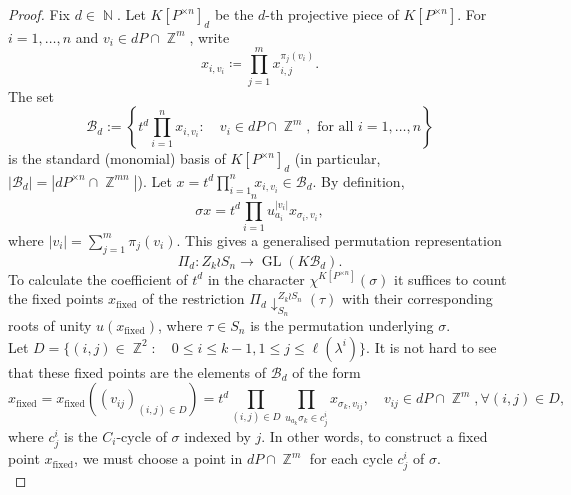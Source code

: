 \documentclass[a4paper,12pt]{amsart}
\theoremstyle{plain}
\theoremstyle{definition}
\theoremstyle{remark}
\DeclareMathOperator{\NN}{\mathbb{N}}
\DeclareMathOperator{\ZZ}{\mathbb{Z}}
\DeclareMathOperator{\fixed}{fixed}
\DeclareMathOperator{\GL}{GL}
\begin{document}
\begin{proof}
    Fix $d \in \NN$. Let $K[P^{\times n}]_d$ be the $d$-th projective piece of $K[P^{\times n}]$. For $i = 1, \ldots, n$ and $v_i \in dP \cap \ZZ^m$, write
    \[
    x_{i, v_i} \coloneq \prod_{j = 1}^m x_{i, j}^{\pi_j(v_i)}.
    \]
    The set
    \[
    \mathcal{B}_d := \left \{ t^d \prod_{i = 1}^n x_{i, v_i}: \quad v_i \in dP \cap \ZZ^m, \text{ for all } i = 1, \ldots, n \right \}
    \]
    is the standard (monomial) basis of $K[P^{\times n}]_d$ (in particular, $|\mathcal{B}_d| = |dP^{\times n} \cap \ZZ^{mn}|$). Let $x = t^d \prod_{i = 1}^n x_{i, v_i} \in \mathcal{B}_d$. By definition,
    \begin{equation}\label{eq:image-basis-element}
        \sigma x = t^d \prod_{i = 1}^n u_{a_i}^{|v_i|} x_{\sigma_i, v_i},
    \end{equation}
    where $|v_i| = \sum_{j = 1}^m \pi_j(v_i)$. This gives a generalised permutation representation 
    \[
    \Pi_d: Z_k \wr S_n \to \GL(K\mathcal{B}_d).
    \]
    To calculate the coefficient of $t^d$ in the character $\chi^{K[P^{\times n}]}(\sigma)$ it suffices to count the fixed points $x_{\fixed}$ of the restriction $\Pi_d \downarrow_{S_n}^{Z_k \wr S_n}(\tau)$ with their corresponding roots of unity $u(x_{\fixed})$, where $\tau \in S_n$ is the permutation underlying $\sigma$. \\
    
    Let $D = \{(i, j) \in \ZZ^2: \quad 0 \leq i \leq k - 1, 1 \leq j \leq \ell(\lambda^i)\}$. It is not hard to see that these fixed points are the elements of $\mathcal{B}_d$ of the form
    \[
    x_{\fixed} = x_{\fixed}\left ((v_{ij})_{(i, j) \in D}\right ) = t^d \prod_{(i, j) \in D}\prod_{u_{a_k}\sigma_k \in c_j^i} x_{\sigma_{k}, v_{ij}}, \quad v_{ij} \in dP \cap \ZZ^m, \forall (i, j) \in D,
    \]
    where $c_j^i$ is the $C_i$-cycle of $\sigma$ indexed by $j$. In other words, to construct a fixed point $x_{\fixed}$, we must choose a point in $dP \cap \ZZ^m$ for each cycle $c_j^i$ of $\sigma$. \\
    

\end{proof}
\end{document}
